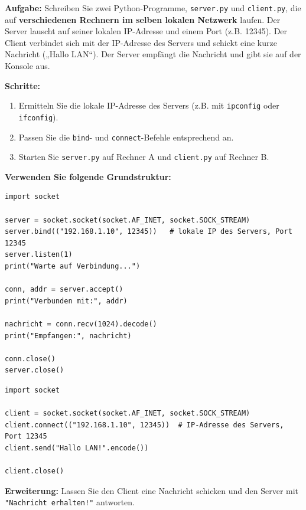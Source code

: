 \begin{myexercise}

    \textbf{Aufgabe:} Schreiben Sie zwei Python-Programme, \texttt{server.py} und \texttt{client.py}, die auf \textbf{verschiedenen Rechnern im selben lokalen Netzwerk} laufen. Der Server lauscht auf seiner lokalen IP-Adresse und einem Port (z.B. 12345). Der Client verbindet sich mit der IP-Adresse des Servers und schickt eine kurze Nachricht („Hallo LAN“). Der Server empfängt die Nachricht und gibt sie auf der Konsole aus.

    \textbf{Schritte:}
    \begin{enumerate}
        \item Ermitteln Sie die lokale IP-Adresse des Servers (z.B. mit \texttt{ipconfig} oder \texttt{ifconfig}).
        \item Passen Sie die \texttt{bind}- und \texttt{connect}-Befehle entsprechend an.
        \item Starten Sie \texttt{server.py} auf Rechner A und \texttt{client.py} auf Rechner B.
    \end{enumerate}

    \textbf{Verwenden Sie folgende Grundstruktur:}

    \begin{lstlisting}[caption=\texttt{server.py}]
import socket

server = socket.socket(socket.AF_INET, socket.SOCK_STREAM)
server.bind(("192.168.1.10", 12345))   # lokale IP des Servers, Port 12345
server.listen(1)
print("Warte auf Verbindung...")

conn, addr = server.accept()
print("Verbunden mit:", addr)

nachricht = conn.recv(1024).decode()
print("Empfangen:", nachricht)

conn.close()
server.close()
    \end{lstlisting}

    \begin{lstlisting}[caption=\texttt{client.py}]
import socket

client = socket.socket(socket.AF_INET, socket.SOCK_STREAM)
client.connect(("192.168.1.10", 12345))  # IP-Adresse des Servers, Port 12345
client.send("Hallo LAN!".encode())

client.close()
    \end{lstlisting}

    \textbf{Erweiterung:} Lassen Sie den Client eine Nachricht schicken und den Server mit \texttt{"Nachricht erhalten!"} antworten.


\end{myexercise}
